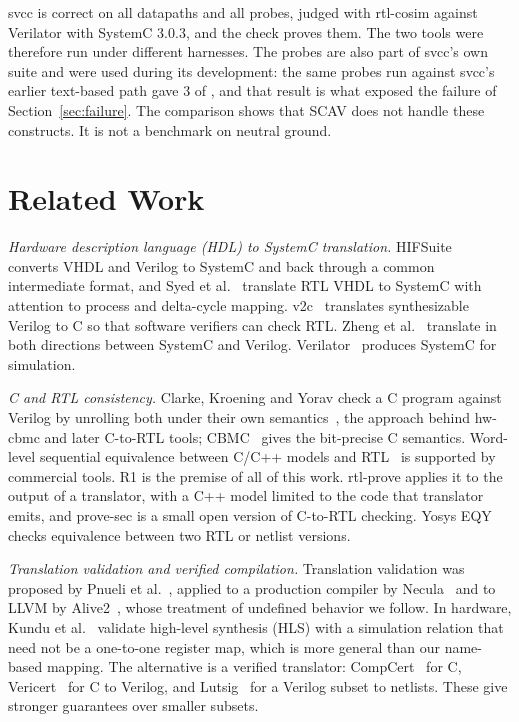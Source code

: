 \documentclass{ieeeaccess}
\newcommand{\code}[1]{{\fontshape{n}\ttfamily #1}}
\begin{document}
\code{svcc} is correct on all \nCorpusRtl{} datapaths and all \nProbes{} probes, judged with
\code{rtl-cosim} against Verilator with SystemC 3.0.3, and the check proves them. The two tools were
therefore run under different harnesses. The probes are also part of \code{svcc}'s own suite and
were used during its development: the same probes run against \code{svcc}'s earlier text-based path
gave 3 of \nProbes{}, and that result is what exposed the failure of Section~\ref{sec:failure}. The
comparison shows that SCAV does not handle these constructs. It is not a benchmark on neutral
ground.

\section{Related Work}
\label{sec:related}

\emph{Hardware description language (HDL) to SystemC translation.} HIFSuite~\cite{bombieri2010hifsuite} converts VHDL and Verilog
to SystemC and back through a common intermediate format, and Syed et al.~\cite{syed2013vhdl2sc}
translate RTL VHDL to SystemC with attention to process and delta-cycle mapping.
v2c~\cite{mukherjee2016v2c} translates synthesizable Verilog to C so that software verifiers can
check RTL. Zheng et al.~\cite{zheng2026bidir} translate in both directions between SystemC and
Verilog. Verilator~\cite{snyder2020verilator} produces SystemC for simulation.

\emph{C and RTL consistency.} Clarke, Kroening and Yorav check a C program against Verilog by
unrolling both under their own semantics~\cite{clarke2003cverilog}, the approach behind
hw-cbmc and later C-to-RTL tools; CBMC~\cite{clarke2004cbmc} gives the
bit-precise C semantics. Word-level sequential equivalence between C/C++ models and
RTL~\cite{koelbl2009c2rtl} is supported by commercial tools. R1 is the premise of all of this
work. \code{rtl-prove} applies it to the output of a translator, with a C++ model limited to the
code that translator emits, and \code{prove-sec} is a small open version of C-to-RTL checking.
Yosys EQY~\cite{yosys_eqy} checks equivalence between two RTL or netlist versions.

\emph{Translation validation and verified compilation.} Translation validation was proposed by
Pnueli et al.~\cite{pnueli1998tv}, applied to a production compiler by Necula~\cite{necula2000tv}
and to LLVM by Alive2~\cite{lopes2021alive2}, whose treatment of undefined behavior we follow. In
hardware, Kundu et al.~\cite{kundu2010tvhls} validate high-level synthesis (HLS) with a simulation
relation that need not be a one-to-one register map, which is more general than our name-based
mapping. The alternative is a verified
translator: CompCert~\cite{leroy2009compcert} for C, Vericert~\cite{herklotz2021vericert} for C to
Verilog, and Lutsig~\cite{loow2021lutsig} for a Verilog subset to netlists. These give stronger
guarantees over smaller subsets.
\end{document}
